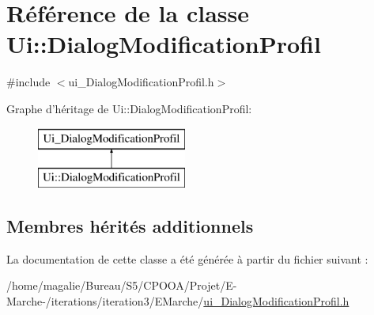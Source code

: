 \hypertarget{class_ui_1_1_dialog_modification_profil}{\section{Référence de la classe Ui\-:\-:Dialog\-Modification\-Profil}
\label{class_ui_1_1_dialog_modification_profil}
}


{\ttfamily \#include $<$ui\-\_\-\-Dialog\-Modification\-Profil.\-h$>$}

Graphe d'héritage de Ui\-:\-:Dialog\-Modification\-Profil\-:\begin{figure}[H]
\begin{center}
\leavevmode
\includegraphics[height=2.000000cm]{class_ui_1_1_dialog_modification_profil}
\end{center}
\end{figure}
\subsection*{Membres hérités additionnels}


La documentation de cette classe a été générée à partir du fichier suivant \-:\begin{DoxyCompactItemize}
\item 
/home/magalie/\-Bureau/\-S5/\-C\-P\-O\-O\-A/\-Projet/\-E-\/\-Marche-\//iterations/iteration3/\-E\-Marche/\hyperlink{ui___dialog_modification_profil_8h}{ui\-\_\-\-Dialog\-Modification\-Profil.\-h}\end{DoxyCompactItemize}
